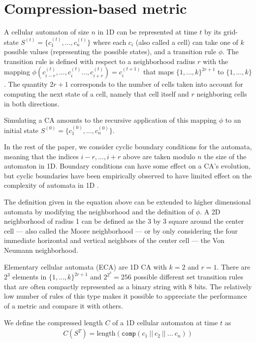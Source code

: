 \section{Compression-based metric}\label{sec:compr-based-metr}

A cellular automaton of size $n$ in 1D can be represented at time $t$ by its
grid-state $S^{(t)} = \{c_1^{(t)}, ..., c_n^{(t)}\}$ where each $c_i$ (also
called a cell) can take one of $k$ possible values (representing the possible
states), and a transition rule $\phi$. The transition rule is defined with
respect to a neighborhood radius $r$ with the mapping $\phi(c^{(t)}_{i-r}, ...,
c^{(t)}_i ..., c^{(t)}_{i+r} ) = c^{(t+1)}_i$ that maps $\{1, ..., k\}^{2r+1}$
to $\{1, ..., k\}$. The quantity $2r + 1$ corresponds to the number of
cells taken into account for computing the next state of a cell, namely that
cell itself and $r$ neighboring cells in both directions.

Simulating a CA amounts to the recursive application of this mapping $\phi$ to
an initial state $S^{(0)} = \{c_1^{(0)}, ..., c_n^{(0)}\}$.

In the rest of the paper, we consider cyclic boundary conditions for the
automata, meaning that the indices $i-r, ..., i+r$ above are taken modulo $n$
the size of the automaton in 1D. Boundary conditions can have some effect on a
CA's evolution, but cyclic boundaries have been empirically observed to have
limited effect on the complexity of automata in 1D
\parencite{luvalleEffectsBoundaryConditions2019}.

The definition given in the equation above can be extended to higher dimensional
automata by modifying the neighborhood and the definition of $\phi$. A 2D
neighborhood of radius 1 can be defined as the 3 by 3 square around the center
cell --- also called the Moore neighborhood --- or by only considering the four
immediate horizontal and vertical neighbors of the center cell --- the Von Neumann
neighborhood.

Elementary cellular automata (ECA) are 1D CA with $k = 2$ and $r = 1$. There are
$2^3$ elements in $\{1, ..., k\}^{2r+1}$ and $2^{2^3} = 256$ possible different
set transition rules that are often compactly represented as a binary string
with 8 bits. The relatively low number of rules of this type makes it possible
to appreciate the performance of a metric and compare it with others.

We define the compressed length $C$ of a 1D cellular automaton at time $t$ as
\begin{align}
  \textstyle
  C(S^{T}) = \text{length}\left(\texttt{comp}(c_1\ ||\ c_2\ ||\ ...\ c_n)\right)
\end{align}


